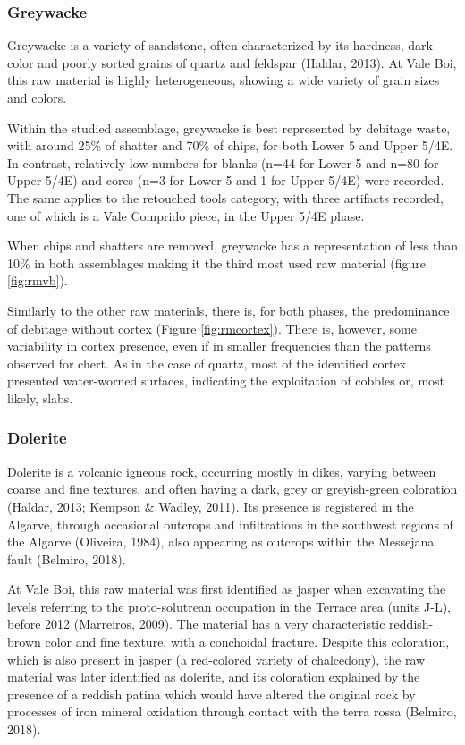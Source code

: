 \documentclass[12pt,twoside]{reedthesis}
\begin{document}
\hypertarget{greywacke}{%
\subsubsection{Greywacke}\label{greywacke}}

Greywacke is a variety of sandstone, often characterized by its hardness, dark color and poorly sorted grains of quartz and feldspar (Haldar, 2013). At Vale Boi, this raw material is highly heterogeneous, showing a wide variety of grain sizes and colors.

Within the studied assemblage, greywacke is best represented by debitage waste, with around 25\% of shatter and 70\% of chips, for both Lower 5 and Upper 5/4E. In contrast, relatively low numbers for blanks (n=44 for Lower 5 and n=80 for Upper 5/4E) and cores (n=3 for Lower 5 and 1 for Upper 5/4E) were recorded. The same applies to the retouched tools category, with three artifacts recorded, one of which is a Vale Comprido piece, in the Upper 5/4E phase.

When chips and shatters are removed, greywacke has a representation of less than 10\% in both assemblages making it the third most used raw material (figure \ref{fig:rmvb}).

Similarly to the other raw materials, there is, for both phases, the predominance of debitage without cortex (Figure \ref{fig:rmcortex}). There is, however, some variability in cortex presence, even if in smaller frequencies than the patterns observed for chert. As in the case of quartz, most of the identified cortex presented water-worned surfaces, indicating the exploitation of cobbles or, most likely, slabs.

\hypertarget{dolerite}{%
\subsubsection{Dolerite}\label{dolerite}}

Dolerite is a volcanic igneous rock, occurring mostly in dikes, varying between coarse and fine textures, and often having a dark, grey or greyish-green coloration (Haldar, 2013; Kempson \& Wadley, 2011). Its presence is registered in the Algarve, through occasional outcrops and infiltrations in the southwest regions of the Algarve (Oliveira, 1984), also appearing as outcrops within the Messejana fault (Belmiro, 2018).

At Vale Boi, this raw material was first identified as jasper when excavating the levels referring to the proto-solutrean occupation in the Terrace area (units J-L), before 2012 (Marreiros, 2009). The material has a very characteristic reddish-brown color and fine texture, with a conchoidal fracture. Despite this coloration, which is also present in jasper (a red-colored variety of chalcedony), the raw material was later identified as dolerite, and its coloration explained by the presence of a reddish patina which would have altered the original rock by processes of iron mineral oxidation through contact with the terra rossa (Belmiro, 2018).
\end{document}
